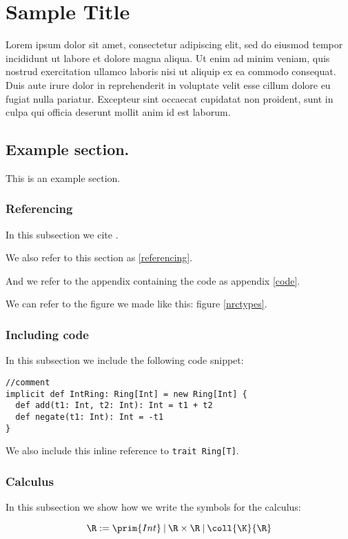 \chapter{Sample Title}

Lorem ipsum dolor sit amet, consectetur adipiscing elit, sed do eiusmod tempor incididunt ut labore et dolore magna aliqua. Ut enim ad minim veniam, quis nostrud exercitation ullamco laboris nisi ut aliquip ex ea commodo consequat. Duis aute irure dolor in reprehenderit in voluptate velit esse cillum dolore eu fugiat nulla pariatur. Excepteur sint occaecat cupidatat non proident, sunt in culpa qui officia deserunt mollit anim id est laborum.

\section{Example section.} {
This is an example section.

\subsection{Referencing} { \label{referencing}
In this subsection we cite \cite{Einstein}.

We also refer to this section as \ref{referencing}.

And we refer to the appendix containing the code as appendix \ref{code}.

We can refer to the figure we made like this: figure \ref{nrctypes}.
}

\subsection{Including code} {
In this subsection we include the following code snippet:

\begin{lstlisting}
//comment
implicit def IntRing: Ring[Int] = new Ring[Int] {
  def add(t1: Int, t2: Int): Int = t1 + t2
  def negate(t1: Int): Int = -t1
}
\end{lstlisting}

We also include this inline reference to \lstinline{trait Ring[T]}.
}

\subsection{Calculus} {
In this subsection we show how we write the symbols for the calculus:
 
\[ \R := \prim{Int} \:|\: \R \times  \R \: | \: \coll{\K}{\R} \]

}}
